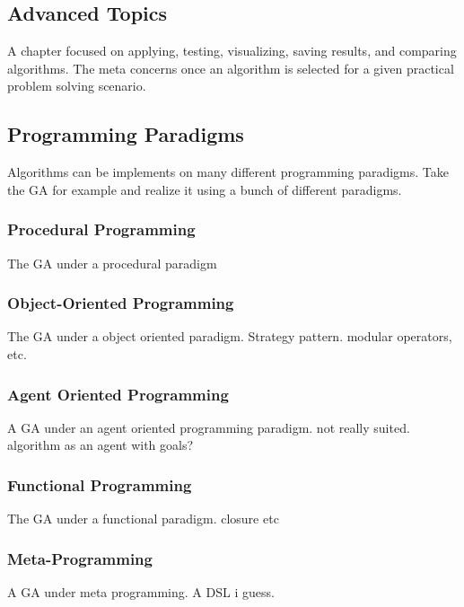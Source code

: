 

\begin{bibunit}
\chapter{Advanced Topics}
\label{ch:advanced}
A chapter focused on applying, testing, visualizing, saving results, and comparing algorithms. The meta concerns once an algorithm is selected for a given practical problem solving scenario.

% 
% 
\section{Programming Paradigms}
\label{advanced:sec:paradigms}
Algorithms can be implements on many different programming paradigms.
Take the GA for example and realize it using a bunch of different paradigms.

\subsection{Procedural Programming}
The GA under a procedural paradigm

\subsection{Object-Oriented Programming}
The GA under a object oriented paradigm. Strategy pattern. modular operators, etc.

\subsection{Agent Oriented Programming}
A GA under an agent oriented programming paradigm. not really suited. algorithm as an agent with goals?

\subsection{Functional Programming}
The GA under a functional paradigm. closure etc

\subsection{Meta-Programming}
A GA under meta programming. A DSL i guess.


\end{bibunit}
